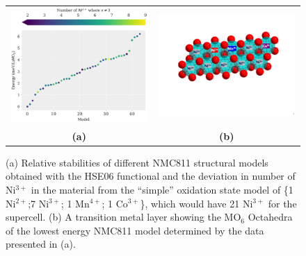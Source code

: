 \documentclass[journal=jacsat,manuscript=article]{achemso}
\begin{document}
\begin{figure}[tb]
  \begin{center}
  \begin{tabular}{c c}
  \includegraphics[width=0.44\columnwidth]{Figures/HSE_energy_cmap.pdf}&\includegraphics[width=0.46\columnwidth]{Figures/TM-ordering.pdf}\\
  \textbf{(a)}&\textbf{(b)}\\
   \end{tabular}
    \caption{\label{fig:stability} (a) Relative stabilities of different NMC811 structural models obtained with the HSE06 functional and the deviation in number of Ni$^{3+}$ in the material from the ``simple'' oxidation state model of \{1 Ni$^{2+}$;7 Ni$^{3+}$; 1 Mn$^{4+}$; 1 Co$^{3+}$\}, which would have 21 Ni$^{3+}$ for the supercell. (b) A transition metal layer showing the MO$_6$ Octahedra of the lowest energy NMC811 model determined by the data presented in (a).}
    \end{center}
\end{figure}
\end{document}
